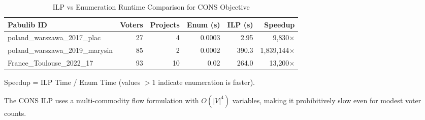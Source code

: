 
\begin{table}[htbp]
\centering
\caption{ILP vs Enumeration Runtime Comparison for CONS Objective}
\label{tab:ilp-vs-enum-cons}
\begin{tabular}{lrrrrr}
\toprule
\textbf{Pabulib ID} & \textbf{Voters} & \textbf{Projects} & \textbf{Enum (s)} & \textbf{ILP (s)} & \textbf{Speedup} \\
\midrule
poland\_warszawa\_2017\_plac & 27 & 4 & 0.0003 & 2.95 & 9{,}830$\times$ \\
poland\_warszawa\_2019\_marysin & 85 & 2 & 0.0002 & 390.3 & 1{,}839{,}144$\times$ \\
France\_Toulouse\_2022\_17 & 93 & 10 & 0.02 & 264.0 & 13{,}200$\times$ \\
\bottomrule
\end{tabular}
\begin{tablenotes}
\small
\item Speedup = ILP Time / Enum Time (values $>1$ indicate enumeration is faster).
\item The CONS ILP uses a multi-commodity flow formulation with $O(|V|^4)$ variables, making it prohibitively slow even for modest voter counts.
\end{tablenotes}
\end{table}
